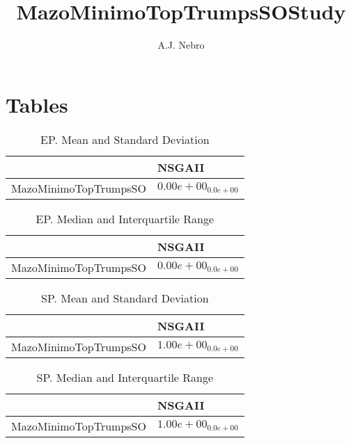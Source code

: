 \documentclass{article}
\title{MazoMinimoTopTrumpsSOStudy}
\author{A.J. Nebro}
\begin{document}
\maketitle
\section{Tables}

\begin{table}
\caption{EP. Mean and Standard Deviation}
\label{table: EP}
\centering
\begin{scriptsize}
\begin{tabular}{ll}
\hline &  NSGAII\\
\hline 
MazoMinimoTopTrumpsSO & \cellcolor{gray95}$  0.00e+00_{ 0.0e+00}$ \\
\hline
\end{tabular}
\end{scriptsize}
\end{table}

\begin{table}
\caption{EP. Median and Interquartile Range}
\label{table: EP}
\centering
\begin{scriptsize}
\begin{tabular}{ll}
\hline &  NSGAII\\
\hline 
MazoMinimoTopTrumpsSO & \cellcolor{gray95}$  0.00e+00_{ 0.0e+00}$ \\
\hline
\end{tabular}
\end{scriptsize}
\end{table}

\begin{table}
\caption{SP. Mean and Standard Deviation}
\label{table: SP}
\centering
\begin{scriptsize}
\begin{tabular}{ll}
\hline &  NSGAII\\
\hline 
MazoMinimoTopTrumpsSO & \cellcolor{gray95}$  1.00e+00_{ 0.0e+00}$ \\
\hline
\end{tabular}
\end{scriptsize}
\end{table}

\begin{table}
\caption{SP. Median and Interquartile Range}
\label{table: SP}
\centering
\begin{scriptsize}
\begin{tabular}{ll}
\hline &  NSGAII\\
\hline 
MazoMinimoTopTrumpsSO & \cellcolor{gray95}$  1.00e+00_{ 0.0e+00}$ \\
\hline
\end{tabular}
\end{scriptsize}
\end{table}
\end{document}
